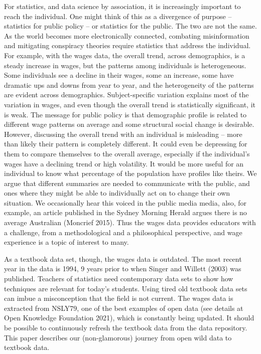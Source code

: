 \documentclass[12pt]{article}
\begin{document}
For statistics, and data science by association, it is increasingly important to reach the individual. One might think of this as a divergence of purpose -- statistics for public policy -- or statistics for the public. The two are not the same. As the world becomes more electronically connected, combating misinformation and mitigating conspiracy theories require statistics that address the individual. For example, with the wages data, the overall trend, across demographics, is a steady increase in wages, but the patterns among individuals is heterogeneous. Some individuals see a decline in their wages, some an increase, some have dramatic ups and downs from year to year, and the heterogeneity of the patterns are evident across demographics. Subject-specific variation explains most of the variation in wages, and even though the overall trend is statistically significant, it is weak. The message for public policy is that demographic profile is related to different wage patterns on average and some structural social change is desirable. However, discussing the overall trend with an individual is misleading -- more than likely their pattern is completely different. It could even be depressing for them to compare themselves to the overall average, especially if the individual's wages have a declining trend or high volatility. It would be more useful for an individual to know what percentage of the population have profiles like theirs. We argue that different summaries are needed to communicate with the public, and ones where they might be able to individually act on to change their own situation. We occasionally hear this voiced in the public media media, also, for example, an article published in the Sydney Morning Herald argues there is no average Australian (Moncrief 2015). Thus the wages data provides educators with a challenge, from a methodological and a philosophical perspective, and wage experience is a topic of interest to many.

As a textbook data set, though, the wages data is outdated. The most recent year in the data is 1994, 9 years prior to when Singer and Willett (2003) was published. Teachers of statistics need contemporary data sets to show how techniques are relevant for today's students. Using tired old textbook data sets can imbue a misconception that the field is not current. The wages data is extracted from NSLY79, one of the best examples of open data (see details at Open Knowledge Foundation 2021), which is constantly being updated. It should be possible to continuously refresh the textbook data from the data repository. This paper describes our (non-glamorous) journey from open wild data to textbook data.
\end{document}
